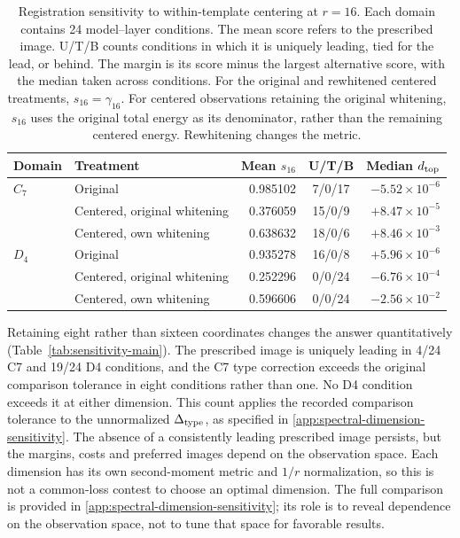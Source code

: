 \begin{table}[!htbp]
\centering
\small
\setlength{\tabcolsep}{5pt}
\caption{
Registration sensitivity to within-template centering at $r=16$.
Each domain contains 24 model--layer conditions.
The mean score refers to the prescribed image.
U/T/B counts conditions in which it is uniquely leading,
tied for the lead, or behind.
The margin is its score minus the largest alternative score,
with the median taken across conditions.
For the original and rewhitened centered treatments,
$s_{16}=\gamma_{16}$.
For centered observations retaining the original whitening,
$s_{16}$ uses the original total energy as its denominator,
rather than the remaining centered energy.
Rewhitening changes the metric.
}
\label{tab:template-centering-main}
\begin{tabular}{llrcr}
\toprule
Domain & Treatment & Mean $s_{16}$ & U/T/B
       & Median $d_{\rm top}$ \\
\midrule
$C_7$ & Original
      & 0.985102 & 7/0/17
      & $-5.52\times10^{-6}$ \\
      & Centered, original whitening
      & 0.376059 & 15/0/9
      & $+8.47\times10^{-5}$ \\
      & Centered, own whitening
      & 0.638632 & 18/0/6
      & $+8.46\times10^{-3}$ \\
\midrule
$D_4$ & Original
      & 0.935278 & 16/0/8
      & $+5.96\times10^{-6}$ \\
      & Centered, original whitening
      & 0.252296 & 0/0/24
      & $-6.76\times10^{-4}$ \\
      & Centered, own whitening
      & 0.596606 & 0/0/24
      & $-2.56\times10^{-2}$ \\
\bottomrule
\end{tabular}
\end{table}


Retaining eight rather than sixteen coordinates changes the answer quantitatively (Table~\ref{tab:sensitivity-main}). The prescribed image is uniquely leading in 4/24 C7 and 19/24 D4 conditions, and the C7 type correction exceeds the original comparison tolerance in eight conditions rather than one. No D4 condition exceeds it at either dimension. This count applies the recorded comparison tolerance to the unnormalized $\Delta_{\rm type}$, as specified in \cref{app:spectral-dimension-sensitivity}. The absence of a consistently leading prescribed image persists, but the margins, costs and preferred images depend on the observation space. Each dimension has its own second-moment metric and $1/r$ normalization, so this is not a common-loss contest to choose an optimal dimension. The full comparison is provided in \cref{app:spectral-dimension-sensitivity}; its role is to reveal dependence on the observation space, not to tune that space for favorable results.

